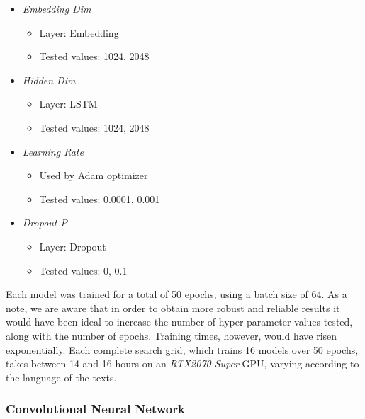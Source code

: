 \documentclass[letterpaper,11pt]{article}
\begin{document}
\begin{itemize}
  \item \textit{Embedding Dim} 
  \begin{itemize}
    \vspace{-0.3em}
    \itemsep-0.35em
    \item Layer: Embedding
    \item Tested values: 1024, 2048 
  \end{itemize}
  \item \textit{Hidden Dim}
  \begin{itemize}
    \vspace{-0.3em}
    \itemsep-0.35em
    \item Layer: LSTM
    \item Tested values: 1024, 2048 
  \end{itemize}
  \item \textit{Learning Rate}
  \begin{itemize}
    \vspace{-0.3em}
    \itemsep-0.35em
    \item Used by Adam optimizer
    \item Tested values: 0.0001, 0.001
  \end{itemize}
  \item \textit{Dropout P}
  \begin{itemize}
    \vspace{-0.3em}
    \itemsep-0.35em
    \item Layer: Dropout
    \item Tested values: 0, 0.1 
  \end{itemize}
\end{itemize}



Each model was trained for a total of 50 epochs, using a batch size of 64. As a note, we are aware that in order to obtain more robust and reliable results it would have been ideal to increase the number of hyper-parameter values tested, along with the number of epochs. Training times, however, would have risen exponentially. Each complete search grid, which trains 16 models over 50 epochs, takes between 14 and 16 hours on an \textit{RTX2070 Super} GPU, varying according to the language of the texts.

\subsubsection*{Convolutional Neural Network}
\end{document}
